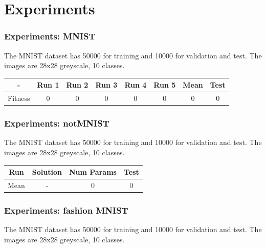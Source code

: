 \documentclass[aspectratio=169]{beamer}
\begin{document}
	\section{Experiments}
		\begin{frame}
			\frametitle{Experiments: MNIST}

			The MNIST dataset has 50000 for training and 10000 for validation and test. The images are 28x28 greyscale, 10 classes.
			
			\begin{table}
				\begin{tabular}{c|c|c|c|c|c|c|c}
					\hline
					   -    & Run 1 & Run 2 & Run 3 & Run 4 & Run 5 & Mean & Test\\ \hline
					Fitness &   0   &   0   &   0   &   0   &   0   &  0   & 0\\ \hline
				\end{tabular}
			\end{table}

		\end{frame}
		\begin{frame}
			\frametitle{Experiments: notMNIST}
			
			The MNIST dataset has 50000 for training and 10000 for validation and test. The images are 28x28 greyscale, 10 classes.
			
			\begin{table}
				\begin{tabular}{c|c|c|c}
					\hline
					Run & Solution & Num Params & Test \\ \hline
					Mean & - & 0 & 0 \\ \hline
				\end{tabular}
			\end{table}
		
		\end{frame}
		\begin{frame}
			\frametitle{Experiments: fashion MNIST}
			
			The MNIST dataset has 50000 for training and 10000 for validation and test. The images are 28x28 greyscale, 10 classes.
		
		\end{frame}
\end{document}
